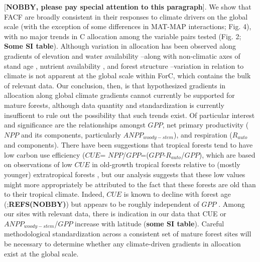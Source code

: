 \documentclass[]{article}
\begin{document}
{[}\textbf{NOBBY, please pay special attention to this paragraph}{]}. We
show that FACF are broadly consistent in their responses to climate
drivers on the global scale (with the exception of some differences in
MAT-MAP interactions; Fig. 4), with no major trends in C allocation
among the variable pairs tested (Fig. 2; \textbf{Some SI table}).
Although variation in allocation has been observed along gradients of
elevation \citep{moser_elevation_2011} and water availability
\citep{newman_above-_2006}--along with non-climatic axes of stand age
\citep{litton_carbon_2007}, nutrient availability
\citep{litton_carbon_2007, gill_belowground_2016}, and forest structure
\citep{taylor_greater_2019}--variation in relation to climate is not
apparent at the global scale within ForC, which contains the bulk of
relevant data. Our conclusion, then, is that hypothesized gradients in
allocation along global climate gradients cannot currently be supported
for mature forests, although data quantity and standardization is
currently insufficent to rule out the possibility that such trends
exist. Of particular interest and significance are the relationships
amongst \(GPP\), net primary productivity (\(NPP\) and its components,
particularly \(ANPP_{woody-stem}\)), and respiration (\(R_{auto}\) and
components). There have been suggestions that tropical forests tend to
have low carbon use efficiency (\(CUE\)=
\(NPP\)/\(GPP\)=(\(GPP\)-\(R_{auto}\)/\(GPP\)), which are based on
observations of low \(CUE\) in old-growth tropical forests relative to
(mostly younger) extratropical forests
\citetext{\citealp{de_lucia_forest_2007}; \citealp[\href{https://www.researchgate.net/publication/227837530_The_productivity_metabolism_and_carbon_cycle_of_tropical_forest_vegetation}{Malhi
2012};][]{anderson-teixeira_carbon_2016}}, but our analysis suggests
that these low values might more appropriately be attributed to the fact
that these forests are old than to their tropical climate. Indeed,
\(CUE\) is known to decline with forest age
(\citep{de_lucia_forest_2007};\textbf{REFS(NOBBY)}) but appears to be
roughly independent of \(GPP\) \citep{litton_carbon_2007}. Among our
sites with relevant data, there is indication in our data that CUE or
\(ANPP_{woody-stem}\)/\(GPP\) increase with latitude (\textbf{some SI
table}). Careful methodological standardization across a consistent set
of mature forest sites will be necessary to determine whether any
climate-driven gradients in allocation exist at the global scale.
\end{document}
